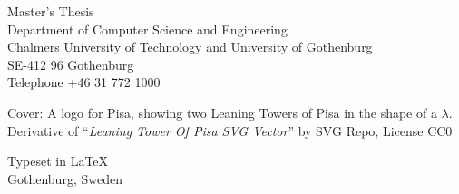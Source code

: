 {Master's Thesis \the\year\\	%
Department of Computer Science and Engineering\\
Chalmers University of Technology and University of Gothenburg\\
SE-412 96 Gothenburg\\
Telephone +46 31 772 1000 \setlength{\parskip}{0.5cm}

\vfill
Cover: A logo for Pisa, showing two Leaning Towers of Pisa in the shape of a $λ$.
Derivative of ``\textit{Leaning Tower Of Pisa SVG Vector}'' by SVG Repo, License CC0


Typeset in \LaTeX \\
Gothenburg, Sweden \the\year

\cleardoublepage
}
